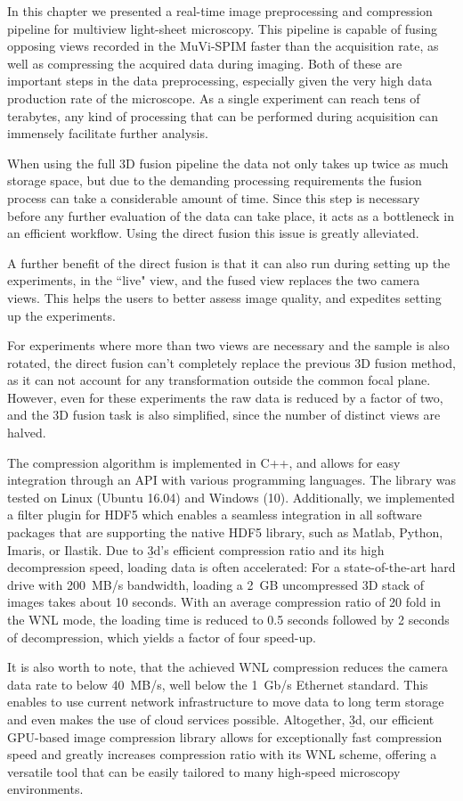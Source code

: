 In this chapter we presented a real-time image preprocessing and compression pipeline for multiview light-sheet microscopy. This pipeline is capable of fusing opposing views recorded in the MuVi-SPIM faster than the acquisition rate, as well as compressing the acquired data during imaging. Both of these are important steps in the data preprocessing, especially given the very high data production rate of the microscope. As a single experiment can reach tens of terabytes, any kind of processing that can be performed during acquisition can immensely facilitate further analysis.

When using the full 3D fusion pipeline the data not only takes up twice as much storage space, but due to the demanding processing requirements the fusion process can take a considerable amount of time. Since this step is necessary before any further evaluation of the data can take place, it acts as a bottleneck in an efficient workflow. Using the direct fusion this issue is greatly alleviated.

A further benefit of the direct fusion is that it can also run during setting up the experiments, in the ``live" view, and the fused view replaces the two camera views. This helps the users to better assess image quality, and expedites setting up the experiments.

For experiments where more than two views are necessary and the sample is also rotated, the direct fusion can't completely replace the previous 3D fusion method, as it can not account for any transformation outside the common focal plane. However, even for these experiments the raw data is reduced by a factor of two, and the 3D fusion task is also simplified, since the number of distinct views are halved.



The compression algorithm is implemented in C++, and allows for easy integration through an API with various programming languages. The library was tested on Linux (Ubuntu 16.04) and Windows (10). Additionally, we implemented a filter plugin for HDF5 which enables a seamless integration in all software packages that are supporting the native HDF5 library, such as Matlab, Python, Imaris, or Ilastik. Due to \b3d’s efficient compression ratio and its high decompression speed, loading data is often accelerated: For a state-of-the-art hard drive with \SI{200}{MB/s} bandwidth, loading a \SI{2}{GB} uncompressed 3D stack of images takes about 10 seconds. With an average compression ratio of 20 fold in the WNL mode, the loading time is reduced to 0.5 seconds followed by 2 seconds of decompression, which yields a factor of four speed-up.

It is also worth to note, that the achieved WNL compression reduces the camera data rate to below \SI{40}{MB/s}, well below the \SI{1}{Gb/s} Ethernet standard. This enables to use current network infrastructure to move data to long term storage and even makes the use of cloud services possible. Altogether, \b3d, our efficient GPU-based image compression library allows for exceptionally fast compression speed and greatly increases compression ratio with its WNL scheme, offering a versatile tool that can be easily tailored to many high-speed microscopy environments.